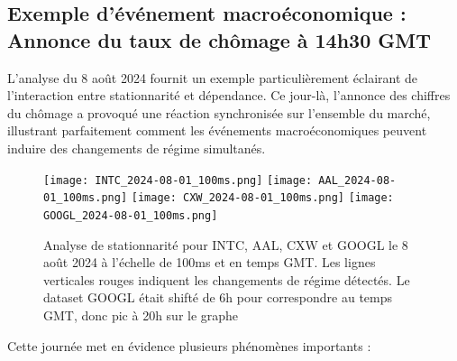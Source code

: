 \documentclass[10pt,a4paper]{article}
\theoremstyle{definition}
\theoremstyle{remark}
\begin{document}
\subsection{Exemple d'événement macroéconomique : Annonce du taux de chômage à 14h30 GMT}

L'analyse du 8 août 2024 fournit un exemple particulièrement éclairant de l'interaction entre stationnarité et dépendance. Ce jour-là, l'annonce des chiffres du chômage a provoqué une réaction synchronisée sur l'ensemble du marché, illustrant parfaitement comment les événements macroéconomiques peuvent induire des changements de régime simultanés.

\begin{figure}[h!]
\centering
    \texttt{[image: INTC\_2024-08-01\_100ms.png]}
    \texttt{[image: AAL\_2024-08-01\_100ms.png]}
    \texttt{[image: CXW\_2024-08-01\_100ms.png]}
    \texttt{[image: GOOGL\_2024-08-01\_100ms.png]}
    \caption{Analyse de stationnarité pour INTC, AAL, CXW et GOOGL le 8 août 2024 à l'échelle de 100ms et en temps GMT. Les lignes verticales rouges indiquent les changements de régime détectés.
    Le dataset GOOGL était shifté de 6h pour correspondre au temps GMT, donc pic à 20h sur le graphe}
    \label{fig:stationarity_unemployment}
\end{figure}

Cette journée met en évidence plusieurs phénomènes importants :
\end{document}
